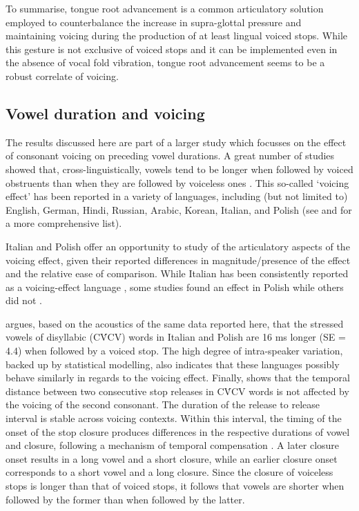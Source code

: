 \documentclass[
  12pt,
]{article}
\begin{document}
To summarise, tongue root advancement is a common articulatory solution
employed to counterbalance the increase in supra-glottal pressure and
maintaining voicing during the production of at least lingual voiced
stops. While this gesture is not exclusive of voiced stops and it can be
implemented even in the absence of vocal fold vibration, tongue root
advancement seems to be a robust correlate of voicing.

\hypertarget{vowel-duration-and-voicing}{%
\subsection{Vowel duration and
voicing}\label{vowel-duration-and-voicing}}

The results discussed here are part of a larger study which focusses on
the effect of consonant voicing on preceding vowel durations. A great
number of studies showed that, cross-linguistically, vowels tend to be
longer when followed by voiced obstruents than when they are followed by
voiceless ones
\citep{house1953, peterson1960, chen1970, klatt1973, lisker1974, farnetani1986, fowler1992, hussein1994, esposito2002, lampp2004, durvasula2012}.
This so-called `voicing effect' has been reported in a variety of
languages, including (but not limited to) English, German, Hindi,
Russian, Arabic, Korean, Italian, and Polish (see
\citealt{maddieson1976} and \citealt{begus2017} for a more comprehensive
list).

Italian and Polish offer an opportunity to study of the articulatory
aspects of the voicing effect, given their reported differences in
magnitude/presence of the effect and the relative ease of comparison.
While Italian has been consistently reported as a voicing-effect
language \citep{caldognetto1979, farnetani1986, esposito2002}, some
studies found an effect in Polish
\citep{slowiaczek1985, nowak2006, malisz2008, coretta2018j} while others
did not \citep{keating1984, jassem1989}.

\citet{coretta2018j} argues, based on the acoustics of the same data
reported here, that the stressed vowels of disyllabic (CV́CV) words in
Italian and Polish are 16 ms longer (SE = 4.4) when followed by a voiced
stop. The high degree of intra-speaker variation, backed up by
statistical modelling, also indicates that these languages possibly
behave similarly in regards to the voicing effect. Finally,
\citet{coretta2018j} shows that the temporal distance between two
consecutive stop releases in CV́CV words is not affected by the voicing
of the second consonant. The duration of the release to release interval
is stable across voicing contexts. Within this interval, the timing of
the onset of the stop closure produces differences in the respective
durations of vowel and closure, following a mechanism of temporal
compensation
\citep{lindblom1967, slis1969a, slis1969, lehiste1970, lehiste1970a}. A
later closure onset results in a long vowel and a short closure, while
an earlier closure onset corresponds to a short vowel and a long
closure. Since the closure of voiceless stops is longer than that of
voiced stops, it follows that vowels are shorter when followed by the
former than when followed by the latter.
\end{document}
